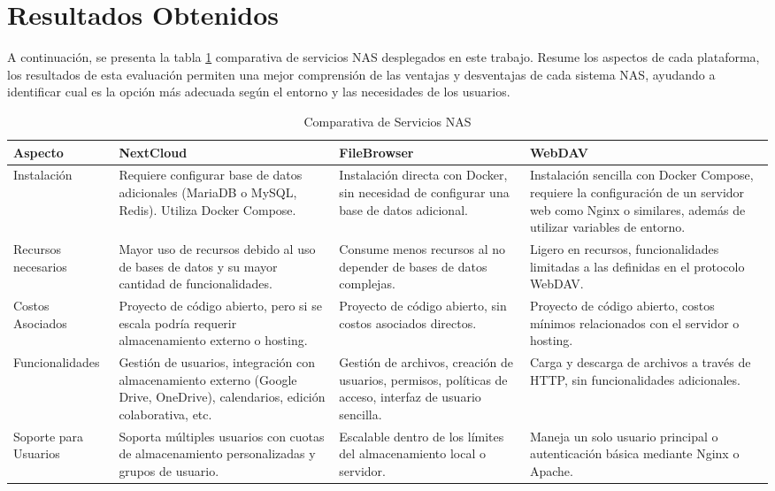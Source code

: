 \documentclass[a4paper,10pt]{article}
\begin{document}
	\section{Resultados Obtenidos}
	A continuación, se presenta la tabla \ref{tabla:comparativa_servicios} comparativa de servicios NAS desplegados en este trabajo. Resume los aspectos de cada plataforma, los resultados de esta evaluación permiten una mejor comprensión de las ventajas y desventajas de cada sistema NAS, ayudando a identificar cual es la opción más adecuada según el entorno y las necesidades de los usuarios.
	
	\begin{table}[htbp]
		\centering
		\caption{Comparativa de Servicios NAS}
		\label{tabla:comparativa_servicios}
		\small
		\begin{tabularx}{\textwidth}{|X|X|X|X|}
			\hline
			\textbf{Aspecto} & \textbf{NextCloud} & \textbf{FileBrowser} & \textbf{WebDAV} \\
			\hline
			Instalación & Requiere configurar base de datos adicionales (MariaDB o MySQL, Redis). Utiliza Docker Compose. & Instalación directa con Docker, sin necesidad de configurar una base de datos adicional. & Instalación sencilla con Docker Compose, requiere la configuración de un servidor web como Nginx o similares, además de utilizar variables de entorno. \\
			\hline
			Recursos necesarios & Mayor uso de recursos debido al uso de bases de datos y su mayor cantidad de funcionalidades. & Consume menos recursos al no depender de bases de datos complejas. & Ligero en recursos, funcionalidades limitadas a las definidas en el protocolo WebDAV. \\
			\hline
			Costos Asociados & Proyecto de código abierto, pero si se escala podría requerir almacenamiento externo o hosting. & Proyecto de código abierto, sin costos asociados directos. & Proyecto de código abierto, costos mínimos relacionados con el servidor o hosting. \\
			\hline
			Funcionalidades & Gestión de usuarios, integración con almacenamiento externo (Google Drive, OneDrive), calendarios, edición colaborativa, etc. & Gestión de archivos, creación de usuarios, permisos, políticas de acceso, interfaz de usuario sencilla. & Carga y descarga de archivos a través de HTTP, sin funcionalidades adicionales. \\
			\hline
			Soporte para Usuarios & Soporta múltiples usuarios con cuotas de almacenamiento personalizadas y grupos de usuario. & Escalable dentro de los límites del almacenamiento local o servidor. & Maneja un solo usuario principal o autenticación básica mediante Nginx o Apache. \\

\end{tabularx}
\end{table}
\end{document}
